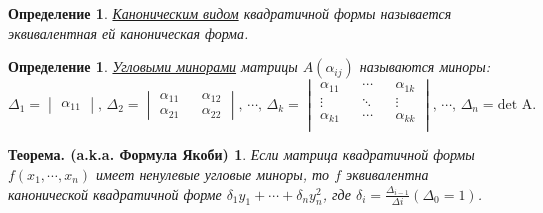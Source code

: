 \documentclass[../../main.tex]{subfiles}
\begin{document}
\newtheorem*{CanonicalViewDef}{Определение}
\begin{CanonicalViewDef}
\underline{Каноническим видом} квадратичной формы называется эквивалентная ей каноническая форма.
\end{CanonicalViewDef}

\newtheorem*{AngleMinorsDef}{Определение}
\begin{AngleMinorsDef}
\underline{Угловыми минорами} матрицы $ A(\alpha_{i j}) $ называются миноры:
\[
\Delta_{1} =
\begin{vmatrix}
  \alpha_{1 1}
\end{vmatrix}
\text{, }
\Delta_{2} =
\begin{vmatrix}
  \alpha_{1 1} && \alpha_{1 2} \\
  \alpha_{2 1} && \alpha_{2 2}
\end{vmatrix}
\text{, }
\cdots
\text{, }
\Delta_{k} =
  \begin{vmatrix}
    \alpha_{1 1} && \cdots && \alpha_{1 k}    \\
    \vdots && \ddots && \vdots                \\
    \alpha_{k 1} && \cdots && \alpha_{k k}    \\
  \end{vmatrix}
\text{, }
\cdots
\text{, }
\Delta_{n} = \text{det A.}
\]
\end{AngleMinorsDef}

\newtheorem*{YakobyTh}{Теорема. (a.k.a. Формула Якоби)}
\begin{YakobyTh}
Если матрица квадратичной формы $f(x_{1}, \cdots, x_{n})$ имеет ненулевые угловые миноры, то
$f$ эквивалентна канонической квадратичной форме $\delta_{1} y_{1} + \cdots + \delta_{n} y^{2}_{n}$,
где $\delta_{i} = \frac{\Delta_{i - 1}}{\Delta{i}} (\Delta_{0} = 1)$.
\end{YakobyTh}
\end{document}
